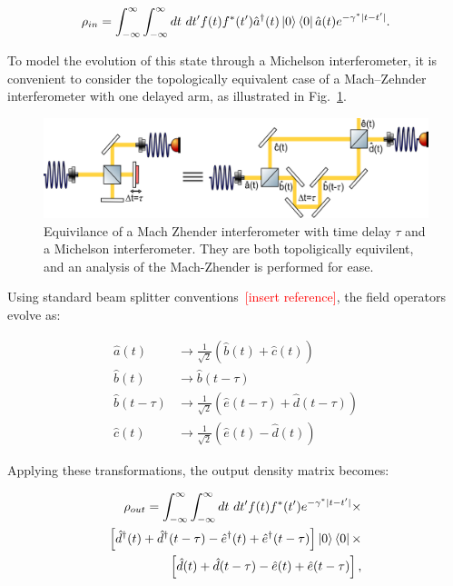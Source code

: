 \begin{equation}
    \rho_{in} = \int_{-\infty}^{\infty}\int_{-\infty}^{\infty}dt \ dt' f(t)f^*(t') \hat{a}^{\dagger}(t) \ket{0} \bra{0} \hat{a}(t) e^{-\gamma^*|t-t'|}.
\end{equation}

To model the evolution of this state through a Michelson interferometer, it is convenient to consider the topologically equivalent case of a Mach–Zehnder interferometer with one delayed arm, as illustrated in Fig.~\ref{fig:MachZhenderMichelson}.


\begin{figure}[h]
    \centering
    \includegraphics[width=0.8\linewidth]{Figures/MachZhenderMichelson.png}
    \caption{Equivilance of a Mach Zhender interferometer with time delay $\tau$ and a Michelson interferometer. They are both topoligically equivilent, and an analysis of the Mach-Zhender is performed for ease.}
    \label{fig:MachZhenderMichelson}
\end{figure}

Using standard beam splitter conventions~\textcolor{red}{[insert reference]}, the field operators evolve as:


\begin{align}
    \hat{a}(t) & \rightarrow \frac{1}{\sqrt{2}}\left(\hat{b}(t) + \hat{c}(t) \right) \label{eqn:MZ1}\\
    \hat{b}(t) & \rightarrow \hat{b}(t-\tau) \label{eqn:MZ2}\\
    \hat{b}(t-\tau) & \rightarrow \frac{1}{\sqrt{2}}\left(\hat{e}(t-\tau) + \hat{d}(t-\tau) \right) \label{eqn:MZ3}\\
    \hat{c}(t) & \rightarrow \frac{1}{\sqrt2} \left( \hat{e}(t)-\hat{d}(t)\right) \label{eqn:MZ4}
\end{align}

Applying these transformations, the output density matrix becomes:

\begin{equation}
\begin{aligned}
    \rho_{out} = \int_{-\infty}^{\infty}\int_{-\infty}^{\infty}dt \ dt' f(t)f^*(t') e^{-\gamma^*|t-t'|} \times \\ 
    \left[\hat{d}^{\dagger}(t)+\hat{d}^{\dagger}(t-\tau)-\hat{e}^{\dagger}(t) + \hat{e}^{\dagger}(t-\tau)\right]
    \ket{0} \bra{0} \times \\
    \left[\hat{d}(t)+\hat{d}(t-\tau)-\hat{e}(t) + \hat{e}(t-\tau)\right],
\end{aligned}
\end{equation}

